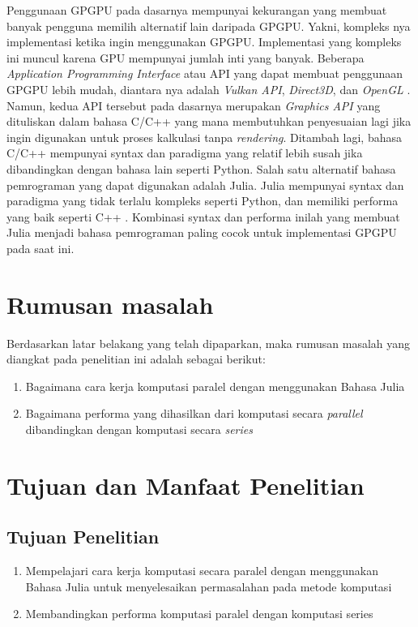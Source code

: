 
Penggunaan GPGPU pada dasarnya mempunyai kekurangan yang membuat banyak
pengguna memilih alternatif lain daripada GPGPU. Yakni, kompleks nya
implementasi ketika ingin menggunakan GPGPU. Implementasi yang kompleks ini
muncul karena GPU mempunyai jumlah inti yang banyak. Beberapa \emph{Application
  Programming Interface} atau API \citep{evansonExplainerWhatAPI2021} yang dapat
membuat penggunaan GPGPU lebih mudah, diantara nya adalah \emph{Vulkan API},
\emph{Direct3D}, dan \emph{OpenGL}
\citep{khairySurveyArchitecturalApproaches2019}. Namun, kedua API tersebut pada
dasarnya merupakan \emph{Graphics API} yang dituliskan dalam bahasa C/C++ yang
mana membutuhkan penyesuaian lagi jika ingin digunakan untuk proses kalkulasi
tanpa \emph{rendering}. Ditambah lagi, bahasa C/C++ mempunyai syntax dan
paradigma yang relatif lebih susah jika dibandingkan dengan bahasa lain seperti
Python. Salah satu alternatif bahasa pemrograman yang dapat digunakan adalah
Julia. Julia mempunyai syntax dan paradigma yang tidak terlalu kompleks seperti
Python, dan memiliki performa yang baik seperti C++
\cite{bezansonJuliaMicroBenchmarks2023}. Kombinasi syntax dan performa inilah
yang membuat Julia menjadi bahasa pemrograman paling cocok untuk implementasi
GPGPU pada saat ini.

\section{Rumusan masalah}
Berdasarkan latar belakang yang telah dipaparkan, maka rumusan masalah yang
diangkat pada penelitian ini adalah sebagai berikut:
\begin{enumerate}
  \item Bagaimana cara kerja komputasi paralel dengan menggunakan Bahasa Julia

  \item Bagaimana performa yang dihasilkan dari komputasi secara \emph{parallel}
        dibandingkan dengan komputasi secara \emph{series}
\end{enumerate}

\section{Tujuan dan Manfaat Penelitian}
\subsection{Tujuan Penelitian}
\begin{enumerate}
  \item Mempelajari cara kerja komputasi secara paralel dengan menggunakan Bahasa Julia
        untuk menyelesaikan permasalahan pada metode komputasi

  \item Membandingkan performa komputasi paralel dengan komputasi series
\end{enumerate}

